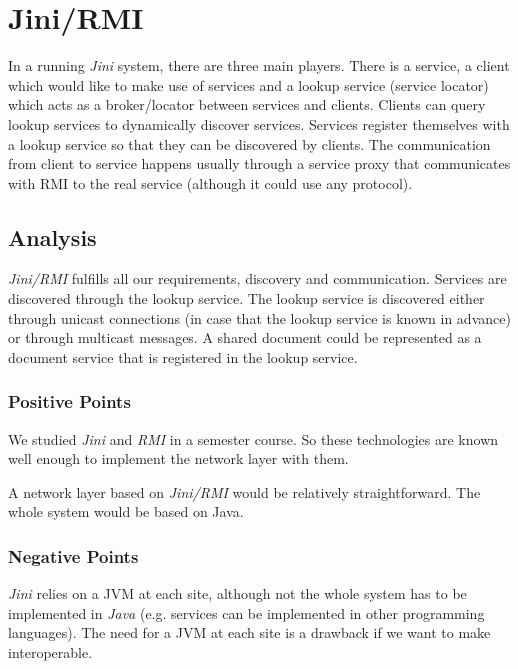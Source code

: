 \section{Jini/RMI}
\label{sect:jini}

In a running \emph{Jini} system, there are three main players. There is a service, a client which would like to make use of services and a lookup service (service locator) which acts as a broker/locator between services and clients. Clients can query lookup services to dynamically discover services. Services register themselves with a lookup service so that they can be discovered by clients. The communication from client to service happens usually through a service proxy that communicates with RMI to the real service (although it could use any protocol).


\subsection{Analysis}
\emph{Jini/RMI} fulfills all our requirements, discovery and communication. Services are discovered through the lookup service. The lookup service is discovered either through unicast connections (in case that the lookup service is known in advance) or through multicast messages. A shared document could be represented as a document service that is registered in the lookup service.

\subsubsection{Positive Points}
We studied \emph{Jini} and \emph{RMI} in a semester course. So these technologies are known well enough to implement the network layer with them.

A network layer based on \emph{Jini/RMI} would be relatively straightforward. The whole system would be based on Java.

\subsubsection{Negative Points}
\emph{Jini} relies on a JVM at each site, although not the whole system has to be implemented in \emph{Java} (e.g. services can be implemented in other programming languages). The need for a JVM at each site is a drawback if we want to make \ace interoperable.

